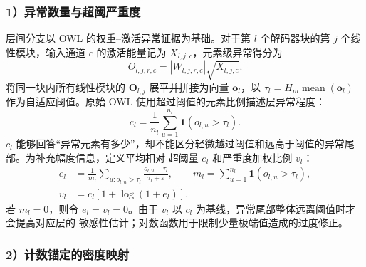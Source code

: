 \documentclass[UTF8,fontset=fandol]{ctexart}
\begin{document}
\subsubsection*{1）异常数量与超阈严重度}

层间分支以 OWL\cite{owl} 的权重--激活异常证据为基础。对于第 $l$ 个解码器块的第 $j$ 个线性模块，输入通道
$c$ 的激活能量记为 $X_{l,j,c}$，元素级异常得分为
\begin{equation}
O_{l,j,r,c}
=
\left|W_{l,j,r,c}\right|\sqrt{X_{l,j,c}} .
\label{eq:outlier}
\end{equation}
将同一块内所有线性模块的 $\bm O_{l,j}$ 展平并拼接为向量 $\bm o_l$，以
$\tau_l=H_m\operatorname{mean}(\bm o_l)$ 作为自适应阈值。原始 OWL 使用超过阈值的元素比例描述层异常程度：
\begin{equation}
c_l
=
\frac{1}{n_l}
\sum_{u=1}^{n_l}\mathbf 1(o_{l,u}>\tau_l).
\label{eq:count}
\end{equation}
$c_l$ 能够回答“异常元素有多少”，却不能区分轻微越过阈值和远高于阈值的异常尾部。为补充幅度信息，定义平均相对
超阈量 $e_l$ 和严重度加权比例 $v_l$：
\begin{equation}
\begin{aligned}
e_l&=
\frac{1}{m_l}
\sum_{u:o_{l,u}>\tau_l}
\frac{o_{l,u}-\tau_l}{\tau_l+\varepsilon},
\qquad
m_l=\sum_{u=1}^{n_l}\mathbf 1(o_{l,u}>\tau_l),\\
v_l&=c_l\left[1+\log(1+e_l)\right].
\end{aligned}
\label{eq:severity}
\end{equation}
若 $m_l=0$，则令 $e_l=v_l=0$。由于 $v_l$ 以 $c_l$ 为基线，异常尾部整体远离阈值时才会提高对应层的
敏感性估计；对数函数用于限制少量极端值造成的过度修正。

\subsubsection*{2）计数锚定的密度映射}
\end{document}
